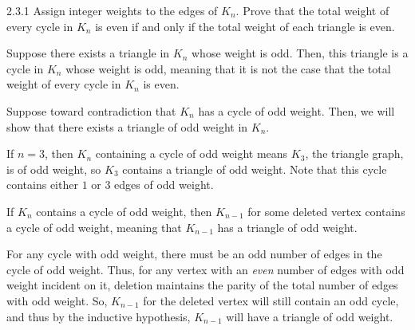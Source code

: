 \documentclass[10pt]{extarticle}
\begin{document}
  \begin{problem}{2.3.1}
    Assign integer weights to the edges of $K_n$. Prove that the total weight of every cycle in $K_n$ is even if and only if the total weight of each triangle is even.
    \tcblower
    \begin{description}[font=\normalfont\scshape]
      \item[$(\Rightarrow)$] Suppose there exists a triangle in $K_n$ whose weight is odd. Then, this triangle is a cycle in $K_n$ whose weight is odd, meaning that it is not the case that the total weight of every cycle in $K_n$ is even.
      \item[$(\Leftarrow)$] Suppose toward contradiction that $K_n$ has a cycle of odd weight. Then, we will show that there exists a triangle of odd weight in $K_n$.
        \begin{description}[font = \normalfont\scshape]
          \item[Base Case:] If $n = 3$, then $K_n$ containing a cycle of odd weight means $K_3$, the triangle graph, is of odd weight, so $K_3$ contains a triangle of odd weight. Note that this cycle contains either $1$ or $3$ edges of odd weight.
          \item[Inductive Hypothesis:] If $K_n$ contains a cycle of odd weight, then $K_{n-1}$ for some deleted vertex contains a cycle of odd weight, meaning that $K_{n-1}$ has a triangle of odd weight.
          \item[Proof:] For any cycle with odd weight, there must be an odd number of edges in the cycle of odd weight. Thus, for any vertex with an \textit{even} number of edges with odd weight incident on it, deletion maintains the parity of the total number of edges with odd weight. So, $K_{n-1}$ for the deleted vertex will still contain an odd cycle, and thus by the inductive hypothesis, $K_{n-1}$ will have a triangle of odd weight.
        \end{description}
    \end{description}
  \end{problem}
\end{document}
